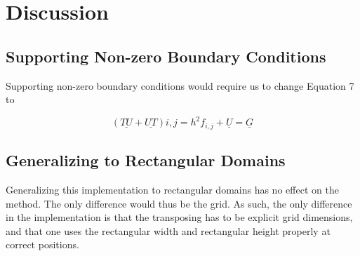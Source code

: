 \section{Discussion}

\subsection{Supporting Non-zero Boundary Conditions}

Supporting non-zero boundary conditions would require us to change Equation 7 to

\begin{equation}
  (\underline{TU} + \underline{UT})i,j = h^2f_{i,j} + \underline U = \underline{G}
\end{equation}



\subsection{Generalizing to Rectangular Domains}
Generalizing this implementation to rectangular domains has no effect on the
method. The only difference would thus be the grid. As such, the only difference
in the implementation is that the transposing has to be explicit grid
dimensions, and that one uses the rectangular width and rectangular height
properly at correct positions.
